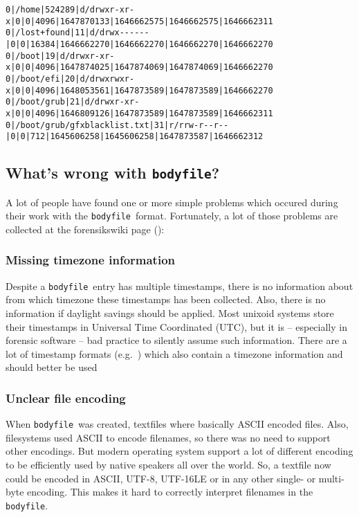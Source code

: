 \documentclass[twocolumn]{article}
\newcommand{\bodyfile}{\texttt{bodyfile}}
\begin{document}
\begin{lstfloat*}
\caption{Sample of a \bodyfile}
\label{lst:bodyfile}
\begin{lstlisting}
0|/home|524289|d/drwxr-xr-x|0|0|4096|1647870133|1646662575|1646662575|1646662311
0|/lost+found|11|d/drwx------|0|0|16384|1646662270|1646662270|1646662270|1646662270
0|/boot|19|d/drwxr-xr-x|0|0|4096|1647874025|1647874069|1647874069|1646662270
0|/boot/efi|20|d/drwxrwxr-x|0|0|4096|1648053561|1647873589|1647873589|1646662270
0|/boot/grub|21|d/drwxr-xr-x|0|0|4096|1646809126|1647873589|1647873589|1646662311
0|/boot/grub/gfxblacklist.txt|31|r/rrw-r--r--|0|0|712|1645606258|1645606258|1647873587|1646662312
\end{lstlisting}
\end{lstfloat*}

\subsection{What's wrong with \bodyfile?}

A lot of people have found one or more simple problems which occured during their work with the \bodyfile\ format. Fortunately, a lot of those problems are collected at the forensikswiki page (\cite{bodyfile}):

\subsubsection{Missing timezone information}

Despite a \bodyfile\ entry has multiple timestamps, there is no information about from which timezone these timestamps has been collected. Also, there is no information if daylight savings should be applied. Most unixoid systems store their timestamps in Universal Time Coordinated (UTC), but it is -- especially in forensic software -- bad practice to silently assume such information. There are a lot of timestamp formats (e.g.~\cite{rfc3339}) which also contain a timezone information and should better be used

\subsubsection{Unclear file encoding}

When \bodyfile\ was created, textfiles where basically ASCII encoded files. Also, filesystems used ASCII to encode filenames, so there was no need to support other encodings. But modern operating system support a lot of different encoding to be efficiently used by native speakers all over the world. So, a textfile now could be encoded in ASCII, UTF-8, UTF-16LE or in any other single- or multi-byte encoding. This makes it hard to correctly interpret filenames in the \bodyfile.



\end{document}
